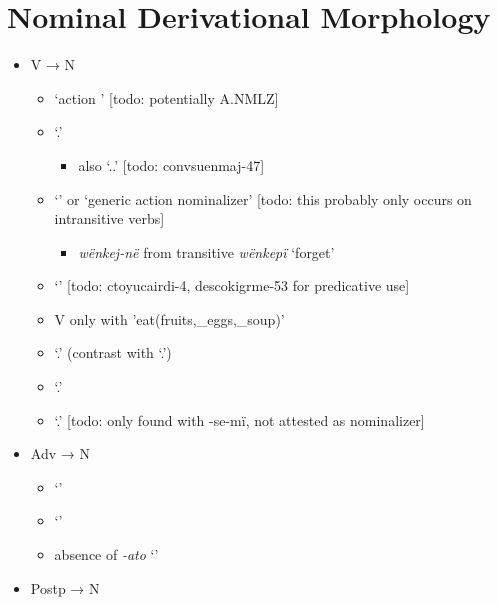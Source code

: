 \documentclass{memoir}
\begin{document}
\section{\texorpdfstring{Nominal Derivational Morphology
\label{sec:nounderiv}}{Nominal Derivational Morphology }}

\begin{itemize}
\tightlist
\item
  V → N

  \begin{itemize}
  \tightlist
  \item
     `action ' {[}todo: potentially A.NMLZ{]}
  \item
     `.'

    \begin{itemize}
    \tightlist
    \item
      also `..' {[}todo: convsuenmaj-47{]}
    \end{itemize}
  \item
     `' or `generic action nominalizer' {[}todo: this
    probably only occurs on intransitive verbs{]}

    \begin{itemize}
    \tightlist
    \item
      \emph{wënkej-në} from transitive \emph{wënkepï} `forget'
    \end{itemize}
  \item
     `' {[}todo: ctoyucairdi-4, descokigrme-53 for
    predicative use{]}
  \item
    V only with  'eat(fruits,\_eggs,\_soup)'
  \item
     `.' (contrast with 
    `.')
  \item
     `.'
  \item
     `.' {[}todo: only found with -se-mï,
    not attested as nominalizer{]}
  \end{itemize}
\item
  Adv → N

  \begin{itemize}
  \tightlist
  \item
     `'
  \item
     `'
  \item
    absence of \emph{-ato} `'
  \end{itemize}
\item
  Postp → N


\end{itemize}
\end{document}
